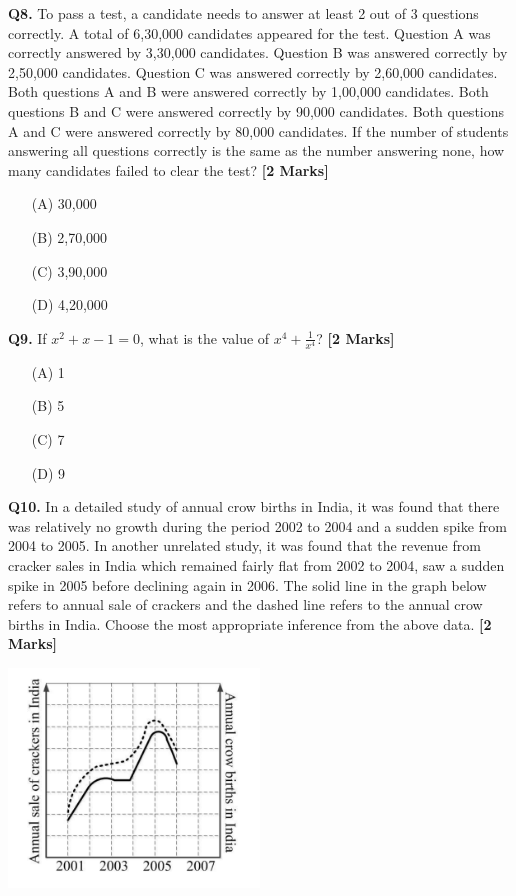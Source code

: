 \documentclass[11pt]{article}
\newcommand{\questionb}[2]{
    \noindent\textbf{Q#2.} #1 \hfill \textbf{[2 Marks]}
}
\begin{document}
\questionb{To pass a test, a candidate needs to answer at least 2 out of 3 questions correctly. A total of 6,30,000 candidates appeared for the test. Question A was correctly answered by 3,30,000 candidates. Question B was answered correctly by 2,50,000 candidates. Question C was answered correctly by 2,60,000 candidates. Both questions A and B were answered correctly by 1,00,000 candidates. Both questions B and C were answered correctly by 90,000 candidates. Both questions A and C were answered correctly by 80,000 candidates. If the number of students answering all questions correctly is the same as the number answering none, how many candidates failed to clear the test?}{8}
\begin{enumerate}
    \item[(A)] 30,000  
    \item[(B)] 2,70,000  
    \item[(C)] 3,90,000  
    \item[(D)] 4,20,000  
\end{enumerate}
\vspace{0.5cm}

\questionb{If \(x^2 + x - 1 = 0\), what is the value of \(x^4 + \frac{1}{x^4}\)?}{9}
\begin{enumerate}
    \item[(A)] 1  
    \item[(B)] 5  
    \item[(C)] 7  
    \item[(D)] 9  
\end{enumerate}
\vspace{0.5cm}

\questionb{In a detailed study of annual crow births in India, it was found that there was relatively no growth during the period 2002 to 2004 and a sudden spike from 2004 to 2005. In another unrelated study, it was found that the revenue from cracker sales in India which remained fairly flat from 2002 to 2004, saw a sudden spike in 2005 before declining again in 2006. The solid line in the graph below refers to annual sale of crackers and the dashed line refers to the annual crow births in India. Choose the most appropriate inference from the above data.}{10}

\begin{center}
\includegraphics[width=0.5\textwidth]{figures/10.png}
\end{center}
\end{document}
